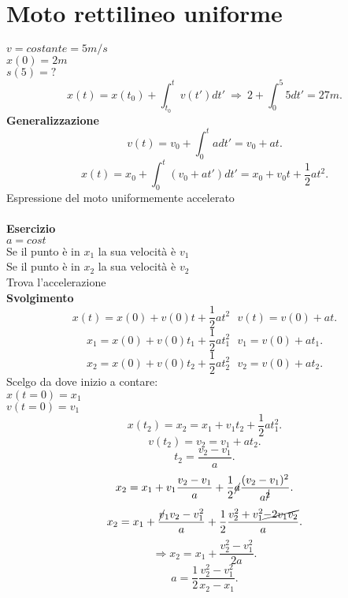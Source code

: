 \documentclass[12px]{article}
\begin{document}
\section{Moto rettilineo uniforme}
$v = costante = 5 m/s$\\
 $x(0) = 2m$\\
  $s(5) = ?$\\ 
  \[
	  x(t) = x(t_0) + \int_{t_0}^t v(t')dt' \ \Rightarrow \ 2 + \int_0^5 5dt' = 27 m
  .\] 
  \textbf{Generalizzazione}\\
  \[
	  v(t) = v_0 + \int_0^t adt'= v_0 + at
  .\] 
  \[
  x(t) = x_0 + \int_0^t (v_0 + at')dt' = x_0 + v_0 t+ \frac 1 2 at^2
  .\] 
  Espressione del moto uniformemente accelerato\\
  \newpage\ \\
  \textbf{Esercizio}\\
  $a = cost$\\
  Se il punto è in $x_1$ la sua velocità è $v_1$\\
  Se il punto è in $x_2$ la sua velocità è $v_2$ \\
  Trova l'accelerazione\\
  \textbf{Svolgimento}\\
  \[
	  x(t) = x(0) + v(0)t + \frac 1 2 at^2\ \ \ v(t) = v(0) + at
  .\] 
  \[
  x_1 = x(0) + v(0)t_1 + \frac 1 2 at_1^2\ \ \ v_1 = v(0) + at_1
  .\] 
  \[
  x_2 = x(0) + v(0)t_2 + \frac 1 2 at_2^2\ \ \ v_2 = v(0) + at_2
  .\] 
  Scelgo da dove inizio a contare:\\
  $x(t=0) = x_1$\\
  $v(t=0) = v_1$
  \[
	  x(t_2) = x_2 = x_1 + v_1t_2 + \frac 1 2 a t_1^2
  .\] 
  \[
  v(t_2) = v_2 = v_1 + at_2
  .\] 
  \[
	  t_2 = \frac{v_2 - v_1}{a}
  .\] 
\[
x_2 = x_1 + v_1\frac{v_2-v_1}{ a} + \frac 1 2 \cancel a\frac{(v_2-v_1)^2}{a^{\cancel 2}}

.\] 
\[
x_2 = x_1 + \frac{\cancel v_1v_2 - v_1^2}{a} + \frac 1 2 \frac {v_2^2 + v_1^2 \cancel{- 2v_1v_2}}{a}
.\] 
\[
	\Rightarrow x_2 = x_1 + \frac {v_2^2 - v_1^2}{2a}
.\] 
\[
	a = \frac 1 2 \frac{v_2^2-v_1^2}{x_2-x_1}
.\] 
	
	
\end{document}
